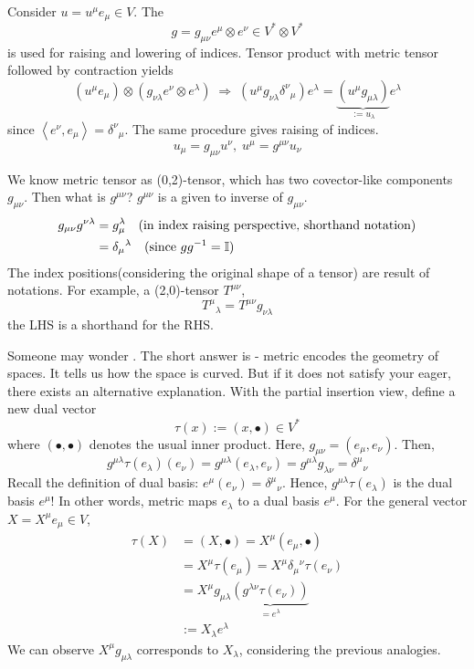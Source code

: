 \documentclass[a4paper, 10pt]{article}
\begin{document}
\begin{definition}
    Consider $u = u^{\mu}e_{\mu} \in V$. The 
    \[ g = g_{\mu\nu}e^{\mu} \otimes e^{\nu} \in V^{\ast} \otimes V^{\ast} \]
    is used for raising and lowering of indices. Tensor product with metric tensor followed by contraction yields
    \[ (u^{\mu}e_{\mu}) \otimes (g_{\nu\lambda}e^{\nu}\otimes e^{\lambda}) \;\Longrightarrow\; (u^{\mu}g_{\nu\lambda}\delta^{\nu}{}_{\mu})e^{\lambda} = \underbrace{(u^{\mu}g_{\mu\lambda})}_{:= u_{\lambda}}e^{\lambda} \]
    since $\left<e^{\nu},e_{\mu}\right> = \delta^{\nu}{}_{\mu}$. The same procedure gives raising of indices.
    \[ u_{\mu} = g_{\mu\nu}u^{\nu}, \; u^{\mu} = g^{\mu \nu} u_{\nu} \]
\end{definition}
\begin{definition}
    We know metric tensor as (0,2)-tensor, which has two covector-like components $g_{\mu\nu}$. Then what is $g^{\mu\nu}$? $g^{\mu\nu}$ is a  given to inverse of $g_{\mu\nu}$.
    \begin{align*}
        g_{\mu\nu}g^{\nu\lambda} &= g_{\mu}^{\lambda} \quad (\text{in index raising perspective, shorthand notation}) \\
        &= \delta_{\mu}{}^{\lambda} \quad (\text{since }gg^{-1} = \mathbb{I})
    \end{align*}
    The  index positions(considering the original shape of a tensor) are result of  notations. For example, a (2,0)-tensor $T^{\mu\nu}$,
    \[ T^{\mu}{}_{\lambda} = T^{\mu\nu}g_{\nu\lambda} \]
    the LHS is a shorthand for the RHS.
\end{definition}
\begin{obs}
    Someone may wonder . The short answer is - metric encodes the geometry of spaces. It tells us how the space is curved. But if it does not satisfy your eager, there exists an alternative explanation. With the partial insertion view, define a new dual vector
    \[ \tau(x) := (x, \bullet) \in V^{\ast} \]
    where $(\bullet,\bullet)$ denotes the usual inner product. Here, $g_{\mu\nu} = (e_{\mu},e_{\nu})$. Then,
    \[ g^{\mu\lambda}\tau(e_{\lambda})(e_{\nu}) = g^{\mu\lambda}(e_{\lambda},e_{\nu}) = g^{\mu\lambda}g_{\lambda\nu} = \delta^{\mu}{}_{\nu} \]
    Recall the definition of dual basis: $e^{\mu}(e_{\nu}) = \delta^{\mu}{}_{\nu}$. Hence, $g^{\mu\lambda}\tau(e_{\lambda})$ is the dual basis $e^{\mu}$! In other words, metric maps $e_{\lambda}$ to a dual basis $e^{\mu}$. For the general vector $X = X^{\mu}e_{\mu} \in V$,
    \begin{align*}
        \tau(X) &= (X, \bullet) = X^{\mu}(e_{\mu},\bullet) \\
        &= X^{\mu}\tau(e_{\mu}) = X^{\mu}\delta_{\mu}{}^{\nu}\tau(e_{\nu}) \\
        &= X^{\mu}g_{\mu\lambda}\underbrace{(g^{\lambda\nu}\tau(e_{\nu}))}_{=e^{\lambda}} \\
        &:= X_{\lambda}e^{\lambda}
    \end{align*}
    We can observe $X^{\mu}g_{\mu\lambda}$ corresponds to $X_{\lambda}$, considering the previous analogies.
\end{obs}
\end{document}
